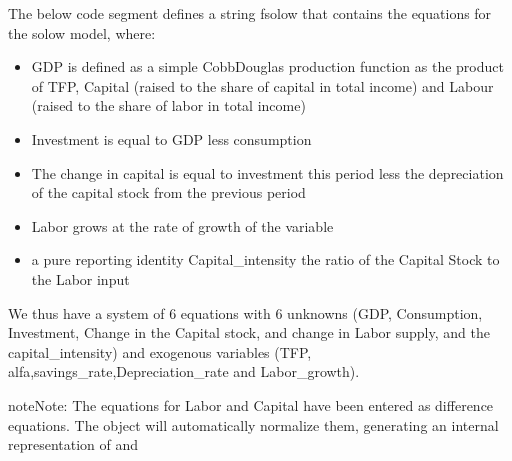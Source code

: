 \documentclass[letterpaper,10pt,english]{jupyterBook}
\begin{document}
\sphinxAtStartPar
The below code segment defines a string fsolow that contains the equations for the solow model, where:
\begin{itemize}
\item {} 
\sphinxAtStartPar
GDP is defined as a simple Cobb\sphinxhyphen{}Douglas production function as the product of TFP, Capital (raised to the share of capital in total income) and Labour (raised to the share of labor in total income)

\item {} 
\sphinxAtStartPar
Investment is equal to GDP less consumption

\item {} 
\sphinxAtStartPar
The change in capital is equal to investment this period less the depreciation of the capital stock from the previous period

\item {} 
\sphinxAtStartPar
Labor grows at the rate of growth of the variable 

\item {} 
\sphinxAtStartPar
a pure reporting identity Capital\_intensity the ratio of the Capital Stock to the Labor input

\end{itemize}

\sphinxAtStartPar
We thus have a system of 6 equations with 6 unknowns (GDP, Consumption, Investment, Change in the Capital stock, and change in Labor supply, and the capital\_intensity) and exogenous variables (TFP, alfa,savings\_rate,Depreciation\_rate and Labor\_growth).

\begin{sphinxadmonition}{note}{Note:}
\sphinxAtStartPar
The equations for Labor and Capital have been entered as difference equations. The  object will automatically normalize them, generating an internal representation of  and 
\end{sphinxadmonition}
\end{document}
